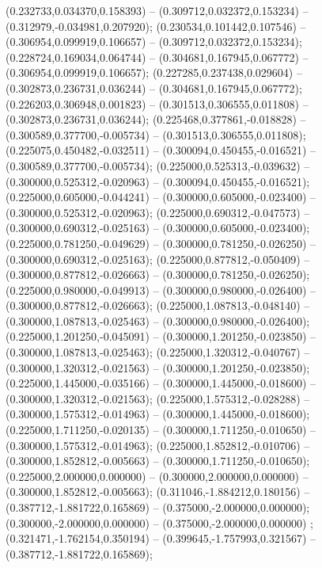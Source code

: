  (0.232733,0.034370,0.158393) -- (0.309712,0.032372,0.153234) -- (0.312979,-0.034981,0.207920);
 (0.230534,0.101442,0.107546) -- (0.306954,0.099919,0.106657) -- (0.309712,0.032372,0.153234);
 (0.228724,0.169034,0.064744) -- (0.304681,0.167945,0.067772) -- (0.306954,0.099919,0.106657);
 (0.227285,0.237438,0.029604) -- (0.302873,0.236731,0.036244) -- (0.304681,0.167945,0.067772);
 (0.226203,0.306948,0.001823) -- (0.301513,0.306555,0.011808) -- (0.302873,0.236731,0.036244);
 (0.225468,0.377861,-0.018828) -- (0.300589,0.377700,-0.005734) -- (0.301513,0.306555,0.011808);
 (0.225075,0.450482,-0.032511) -- (0.300094,0.450455,-0.016521) -- (0.300589,0.377700,-0.005734);
 (0.225000,0.525313,-0.039632) -- (0.300000,0.525312,-0.020963) -- (0.300094,0.450455,-0.016521);
 (0.225000,0.605000,-0.044241) -- (0.300000,0.605000,-0.023400) -- (0.300000,0.525312,-0.020963);
 (0.225000,0.690312,-0.047573) -- (0.300000,0.690312,-0.025163) -- (0.300000,0.605000,-0.023400);
 (0.225000,0.781250,-0.049629) -- (0.300000,0.781250,-0.026250) -- (0.300000,0.690312,-0.025163);
 (0.225000,0.877812,-0.050409) -- (0.300000,0.877812,-0.026663) -- (0.300000,0.781250,-0.026250);
 (0.225000,0.980000,-0.049913) -- (0.300000,0.980000,-0.026400) -- (0.300000,0.877812,-0.026663);
 (0.225000,1.087813,-0.048140) -- (0.300000,1.087813,-0.025463) -- (0.300000,0.980000,-0.026400);
 (0.225000,1.201250,-0.045091) -- (0.300000,1.201250,-0.023850) -- (0.300000,1.087813,-0.025463);
 (0.225000,1.320312,-0.040767) -- (0.300000,1.320312,-0.021563) -- (0.300000,1.201250,-0.023850);
 (0.225000,1.445000,-0.035166) -- (0.300000,1.445000,-0.018600) -- (0.300000,1.320312,-0.021563);
 (0.225000,1.575312,-0.028288) -- (0.300000,1.575312,-0.014963) -- (0.300000,1.445000,-0.018600);
 (0.225000,1.711250,-0.020135) -- (0.300000,1.711250,-0.010650) -- (0.300000,1.575312,-0.014963);
 (0.225000,1.852812,-0.010706) -- (0.300000,1.852812,-0.005663) -- (0.300000,1.711250,-0.010650);
 (0.225000,2.000000,0.000000) -- (0.300000,2.000000,0.000000) -- (0.300000,1.852812,-0.005663);
 (0.311046,-1.884212,0.180156) -- (0.387712,-1.881722,0.165869) -- (0.375000,-2.000000,0.000000);
 (0.300000,-2.000000,0.000000) -- (0.375000,-2.000000,0.000000) ;
 (0.321471,-1.762154,0.350194) -- (0.399645,-1.757993,0.321567) -- (0.387712,-1.881722,0.165869);
